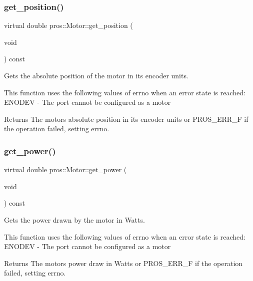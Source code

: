 \subsubsection{\texorpdfstring{get\+\_\+position()}{get\_position()}}
{\footnotesize\ttfamily virtual double pros\+::\+Motor\+::get\+\_\+position (\begin{DoxyParamCaption}\item[{void}]{ }\end{DoxyParamCaption}) const\hspace{0.3cm}{\ttfamily [virtual]}}

Gets the absolute position of the motor in its encoder units.

This function uses the following values of errno when an error state is reached\+: E\+N\+O\+D\+EV -\/ The port cannot be configured as a motor

\begin{DoxyReturn}{Returns}
The motor\textquotesingle{}s absolute position in its encoder units or P\+R\+O\+S\+\_\+\+E\+R\+R\+\_\+F if the operation failed, setting errno. 
\end{DoxyReturn}
\mbox{\label{classpros_1_1Motor_a51b75dc245257487116e64fa2904d521}} 
\subsubsection{\texorpdfstring{get\+\_\+power()}{get\_power()}}
{\footnotesize\ttfamily virtual double pros\+::\+Motor\+::get\+\_\+power (\begin{DoxyParamCaption}\item[{void}]{ }\end{DoxyParamCaption}) const\hspace{0.3cm}{\ttfamily [virtual]}}

Gets the power drawn by the motor in Watts.

This function uses the following values of errno when an error state is reached\+: E\+N\+O\+D\+EV -\/ The port cannot be configured as a motor

\begin{DoxyReturn}{Returns}
The motor\textquotesingle{}s power draw in Watts or P\+R\+O\+S\+\_\+\+E\+R\+R\+\_\+F if the operation failed, setting errno. 
\end{DoxyReturn}
\mbox{\label{classpros_1_1Motor_ae82c57d590e18d7d90afec1e9cc3bb4e}} 
